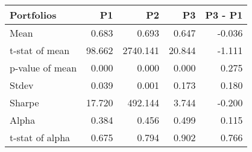 \begin{tabular}{lrrrr}
\toprule
Portfolios & P1 & P2 & P3 & P3 - P1 \\
\midrule
Mean & 0.683 & 0.693 & 0.647 & -0.036 \\
t-stat of mean & 98.662 & 2740.141 & 20.844 & -1.111 \\
p-value of mean & 0.000 & 0.000 & 0.000 & 0.275 \\
Stdev & 0.039 & 0.001 & 0.173 & 0.180 \\
Sharpe & 17.720 & 492.144 & 3.744 & -0.200 \\
Alpha & 0.384 & 0.456 & 0.499 & 0.115 \\
t-stat of alpha & 0.675 & 0.794 & 0.902 & 0.766 \\
\bottomrule
\end{tabular}
